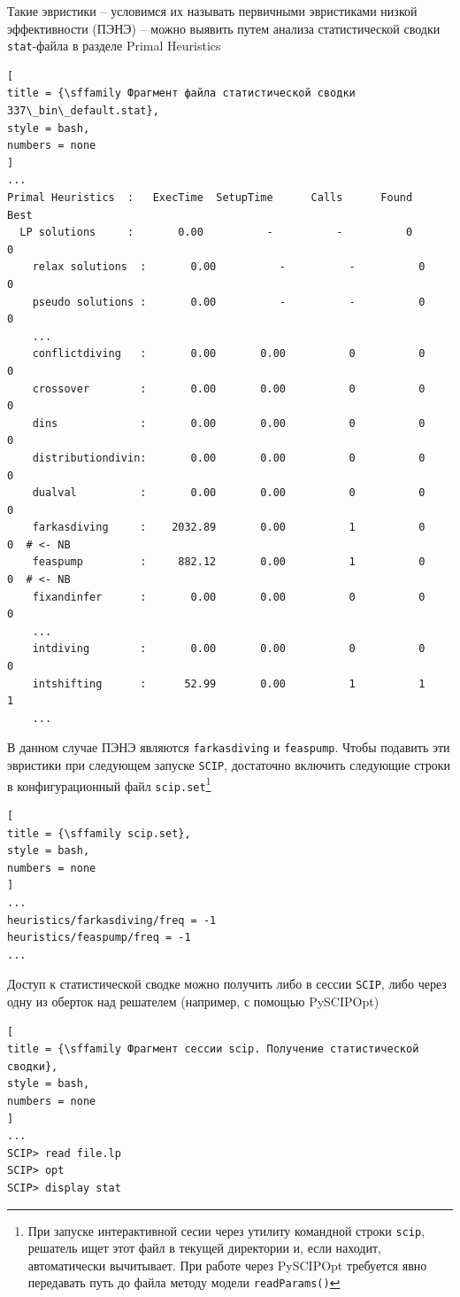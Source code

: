 \documentclass[%
	11pt,
	a4paper,
	utf8,
		]{article}
\begin{document}
Такие эвристики -- условимся их называть первичными эвристиками низкой эффективности (ПЭНЭ) -- можно выявить путем анализа статистической сводки \verb|stat|-файла в разделе Primal Heuristics
\begin{lstlisting}[
title = {\sffamily Фрагмент файла статистической сводки 337\_bin\_default.stat},
style = bash,
numbers = none
]
...
Primal Heuristics  :   ExecTime  SetupTime      Calls      Found       Best
  LP solutions     :       0.00          -          -          0          0
	relax solutions  :       0.00          -          -          0          0
	pseudo solutions :       0.00          -          -          0          0
	...
	conflictdiving   :       0.00       0.00          0          0          0
	crossover        :       0.00       0.00          0          0          0
	dins             :       0.00       0.00          0          0          0
	distributiondivin:       0.00       0.00          0          0          0
	dualval          :       0.00       0.00          0          0          0
	farkasdiving     :    2032.89       0.00          1          0          0  # <- NB
	feaspump         :     882.12       0.00          1          0          0  # <- NB
	fixandinfer      :       0.00       0.00          0          0          0
	...
	intdiving        :       0.00       0.00          0          0          0
	intshifting      :      52.99       0.00          1          1          1
	...
\end{lstlisting}

В данном случае ПЭНЭ являются \texttt{farkasdiving} и \texttt{feaspump}. Чтобы подавить эти эвристики при следующем запуске \texttt{SCIP}, достаточно включить следующие строки в конфигурационный файл \texttt{scip.set}\footnote{При запуске интерактивной сесии через утилиту командной строки \texttt{scip}, решатель ищет этот файл в текущей директории и, если находит, автоматически вычитывает. При работе через PySCIPOpt требуется явно передавать путь до файла методу модели \texttt{readParams()}}
\begin{lstlisting}[
title = {\sffamily scip.set},
style = bash,
numbers = none
]
...
heuristics/farkasdiving/freq = -1
heuristics/feaspump/freq = -1
...
\end{lstlisting}

Доступ к статистической сводке можно получить либо в сессии \texttt{SCIP}, либо через одну из оберток над решателем (например, с помощью PySCIPOpt)
\begin{lstlisting}[
title = {\sffamily Фрагмент сессии scip. Получение статистической сводки},
style = bash,
numbers = none
]
...
SCIP> read file.lp
SCIP> opt
SCIP> display stat
\end{lstlisting}
\end{document}
